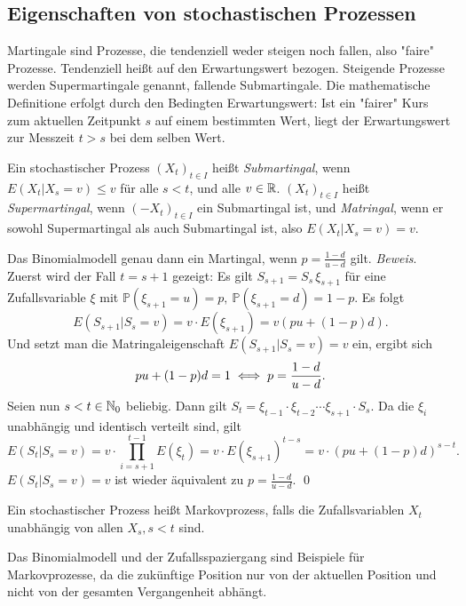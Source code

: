 \subsection{Eigenschaften von stochastischen Prozessen}

\begin{defi}[Martingal]
Martingale sind Prozesse, die tendenziell weder steigen noch fallen, 
also "faire" Prozesse. Tendenziell heißt auf den Erwartungswert bezogen. 
Steigende Prozesse werden Supermartingale genannt, fallende Submartingale. 
Die mathematische Definitione erfolgt durch den Bedingten Erwartungswert: 
Ist ein "fairer" Kurs zum aktuellen Zeitpunkt $s$ auf einem bestimmten Wert, 
liegt der Erwartungswert zur Messzeit $t \gt s$ bei dem selben Wert.

Ein stochastischer Prozess $(X_t)_{t \in I}$ heißt \textit{Submartingal}, wenn 
$E(X_t|X_s=v) \le v$  für alle $s \lt t$, und alle $v \in \Bbb R$. $(X_t)_{t \in I}$
 heißt \textit{Supermartingal}, wenn  $(-X_t)_{t \in I}$ ein Submartingal ist, und \textit{Matringal}, 
 wenn er sowohl Supermartingal als auch Submartingal ist, also $E(X_t|X_s=v) = v$.
\end{defi}

\begin{lemma}
Das Binomialmodell genau dann ein Martingal, wenn $p=\frac{1-d}{u-d}$ gilt. 
\textit{Beweis}.
Zuerst wird der Fall $t = s + 1$ gezeigt:
Es gilt $S_{s+1}=S_s\,\xi_{s+1}$ für eine Zufallsvariable $\xi$ mit $\mathbb{P}(\xi_{s+1}=u)=p,\ \mathbb{P}(\xi_{s+1}=d)=1-p$. Es folgt
$$E(S_{s+1}|S_s=v)= v \cdot E(\xi_{s+1})=v(pu+(1-p)d).$$
Und setzt man die Matringaleigenschaft $E(S_{s+1}|S_s=v)=v$ ein, ergibt sich
$$pu+(1-p)d=1\\[6pt] \iff p=\frac{1-d}{u-d}.$$
Seien nun $s < t \in \Bbb N_0$ beliebig. Dann gilt $S_t=\xi_{t-1}\cdot \xi_{t-2}\cdots \xi_{s+1}\cdot S_s$. Da die $\xi_i$ unabhängig und identisch verteilt sind, gilt
$$E(S_t|S_s=v)=v \cdot \prod_{i=s+1}^{t-1} E(\xi_t)=v \cdot E(\xi_{s+1})^{t-s}=v \cdot (pu+(1-p)d)^{s-t}.$$
$E(S_t|S_s=v)=v$ ist wieder äquivalent zu $p=\frac{1-d}{u-d}$. \qed
\end{lemma}

\begin{defi}[Markovprozess]
Ein stochastischer Prozess heißt Markovprozess, falls die 
Zufallsvariablen $X_t$ unabhängig von allen $X_s, s \lt t$ sind.
\end{defi}

\begin{bsp}
Das Binomialmodell und der Zufallsspaziergang sind Beispiele für Markovprozesse, da die zukünftige Position 
nur von der aktuellen Position und nicht von der gesamten Vergangenheit abhängt.
\end{bsp}